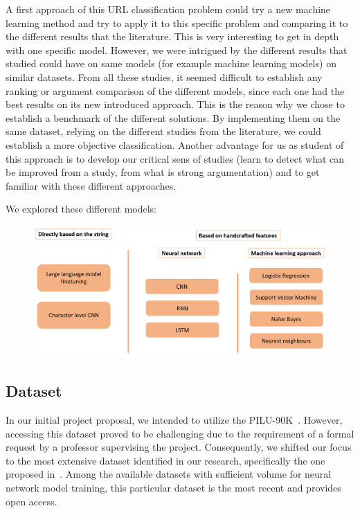 \documentclass{article}
\begin{document}
    A first approach of this URL classification problem could try a new machine learning method and try to apply it to this specific problem and comparing it to the different results that the literature.
    This is very interesting to get in depth with one specific model.
    However, we were intrigued by the different results that studied could have on same models (for example machine learning models) on similar datasets.
    From all these studies, it seemed difficult to establish any ranking or argument comparison of the different models, since each one had the best results on its new introduced approach.
    This is the reason why we chose to establish a benchmark of the different solutions.
    By implementing them on the same dataset, relying on the different studies from the literature, we could establish a more objective classification.
    Another advantage for us as student of this approach is to develop our critical sens of studies (learn to detect what can be improved from a study, from what is strong argumentation) and to get familiar with these different approaches.

    We explored these different models:
    \begin{figure}[H]
        \centering
        \includegraphics[width=\linewidth]{report_img/modelspresentation}
        \caption{}
        \label{fig:model_presentation}
    \end{figure}

    \subsection{Dataset}\label{subsec:dataset}
    In our initial project proposal, we intended to utilize the PILU-90K~\cite{PhishingURLDetection}.
    However, accessing this dataset proved to be challenging due to the requirement of a formal request by a professor supervising the project.
    Consequently, we shifted our focus to the most extensive dataset identified in our research, specifically the one proposed in~\cite{VisualizingRNNInURLDetection}.
    Among the available datasets with sufficient volume for neural network model training, this particular dataset is the most recent and provides open access.
\end{document}
